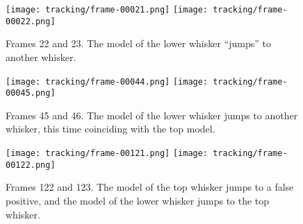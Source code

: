 \begin{figure}[p]
  \centering
  \texttt{[image: tracking/frame-00021.png]}
  \texttt{[image: tracking/frame-00022.png]}
  \caption{Frames 22 and 23. The model of the lower whisker ``jumps''
    to another whisker.}
  \label{fig:rtracking-jump}
\end{figure}

\begin{figure}[p]
  \centering
  \texttt{[image: tracking/frame-00044.png]}
  \texttt{[image: tracking/frame-00045.png]}
  \caption{Frames 45 and 46. The model of the lower whisker jumps to
    another whisker, this time coinciding with the top model.}
  \label{fig:rtracking-jump-coincide}
\end{figure}

\begin{figure}[p]
  \centering
  \texttt{[image: tracking/frame-00121.png]}
  \texttt{[image: tracking/frame-00122.png]}
  \caption{Frames 122 and 123. The model of the top whisker jumps to a
    false positive, and the model of the lower whisker jumps to the
    top whisker.}
  \label{fig:rtracking-false-positive}
\end{figure}


